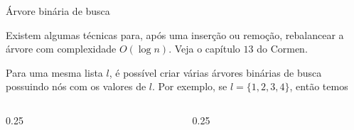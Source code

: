 \begin{frame}{Árvore binária de busca}

    Existem algumas técnicas para, após uma inserção ou remoção, rebalancear a árvore com complexidade $O(\log n)$. Veja o capítulo $13$ do Cormen.

    Para uma mesma lista $l$, é possível criar várias árvores binárias de busca possuindo nós com os valores de $l$. Por exemplo, se $l = \{1, 2, 3, 4\}$, então temos

    \begin{columns}
        \begin{column}{0.25\textwidth}
        \end{column}
        \begin{column}{0.25\textwidth}
        \end{column}
    \end{columns}


\end{frame}